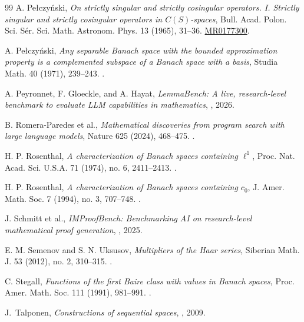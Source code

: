 \documentclass[11pt,reqno]{amsart}
\theoremstyle{plain}
\theoremstyle{definition}
\begin{document}
\begin{thebibliography}{99}
A. Pe{\l}czy\'nski,
\newblock \emph{On strictly singular and strictly cosingular operators. I. Strictly singular and strictly cosingular operators in $C(S)$-spaces},
\newblock Bull. Acad. Polon. Sci. S\'er. Sci. Math. Astronom. Phys. 13 (1965), 31--36.
\newblock \href{https://mathscinet.ams.org/mathscinet-getitem?mr=0177300}{MR0177300}.

A. Pe{\l}czy\'nski,
\newblock \emph{Any separable Banach space with the bounded approximation property is a complemented subspace of a Banach space with a basis},
\newblock Studia Math. 40 (1971), 239--243.
\newblock {}.

A. Peyronnet, F. Gloeckle, and A. Hayat,
\newblock \emph{LemmaBench: A live, research-level benchmark to evaluate LLM capabilities in mathematics},
\newblock {}, 2026.

B. Romera-Paredes et al.,
\newblock \emph{Mathematical discoveries from program search with large language models},
\newblock Nature 625 (2024), 468--475.
\newblock {}.

H. P. Rosenthal,
\newblock \emph{A characterization of Banach spaces containing $\ell^1$},
\newblock Proc. Nat. Acad. Sci. U.S.A. 71 (1974), no. 6, 2411--2413.
\newblock {}.

H. P. Rosenthal,
\newblock \emph{A characterization of Banach spaces containing $c_0$},
\newblock J. Amer. Math. Soc. 7 (1994), no. 3, 707--748.
\newblock {}.

J. Schmitt et al.,
\newblock \emph{IMProofBench: Benchmarking AI on research-level mathematical proof generation},
\newblock {}, 2025.

E. M. Semenov and S. N. Uksusov,
\newblock \emph{Multipliers of the Haar series},
\newblock Siberian Math. J. 53 (2012), no. 2, 310--315.
\newblock {}.

C. Stegall,
\newblock \emph{Functions of the first Baire class with values in Banach spaces},
\newblock Proc. Amer. Math. Soc. 111 (1991), 981--991.
\newblock {}.

J.~Talponen,
\newblock \emph{Constructions of sequential spaces},
\newblock {}, 2009.


\end{thebibliography}
\end{document}
